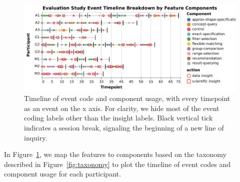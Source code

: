 
\begin{figure}[h!]
  \includegraphics[width=\linewidth]{figures/evalstudytimeline.pdf}
  \caption{Timeline of event code and component usage, with every timepoint as an event on the x axis. For clarity, we hide most of the event coding labels other than the insight labels. Black vertical tick indicates a session break, signaling the beginning of a new line of inquiry.}\label{fig:evalstudytimeline}
\end{figure}
In Figure~\ref{fig:evalstudytimeline}, we map the features to components based on the taxonomy described in Figure~\ref{fig:taxonomy} to plot the timeline of event codes and component usage for each participant.

